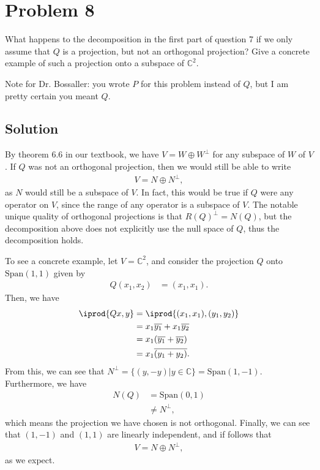 \documentclass[10pt,a4paper]{article}
\theoremstyle{definition}
\begin{document}
\section*{Problem 8}
What happens to the decomposition in the first part of question 7 if we only assume that $Q$ is a projection, but not an orthogonal projection? Give a concrete example of such a projection onto a subspace of $\mathbb{C}^2$.

Note for Dr. Bossaller: you wrote $P$ for this problem instead of $Q$, but I am pretty certain you meant $Q$.

\subsection*{Solution}
By theorem 6.6 in our textbook, we have $V = W \oplus W^\perp$ for any subspace of $W$ of $V$. If $Q$ was not an orthogonal projection, then we would still be able to write
\begin{align*}
V = N \oplus N^\perp,
\end{align*}
as $N$ would still be a subspace of $V$. In fact, this would be true if $Q$ were any operator on $V$, since the range of any operator is a subspace of $V$. The notable unique quality of orthogonal projections is that $R(Q)^\perp = N(Q)$, but the decomposition above does not explicitly use the null space of $Q$, thus the decomposition holds.

To see a concrete example, let $V = \mathbb{C}^2$, and consider the projection $Q$ onto $\text{Span}(1,1)$ given by 
\begin{align*}
Q (x_1, x_2) &= (x_1, x_1).
\end{align*}
Then, we have
\begin{align*}
\iprod{Qx, y} &= \iprod{(x_1, x_1), (y_1, y_2)}\\
&= x_1 \overline{y_1} + x_1 \overline{y_2}\\
&= x_1 (\overline{y_1} + \overline{y_2})\\
&= x_1 \overline{(y_1 + y_2)}.
\end{align*}
From this, we can see that $N^\perp = \{(y, -y) | y \in \mathbb{C} \} = \text{Span}(1, -1)$. Furthermore, we have
\begin{align*}
N(Q) &= \text{Span}(0, 1)\\
&\not = N^\perp,
\end{align*}
which means the projection we have chosen is not orthogonal. Finally, we can see that $(1, -1)$ and $(1, 1)$ are linearly independent, and if follows that 
\begin{align*}
V = N \oplus N^\perp,
\end{align*}
as we expect.
\end{document}
